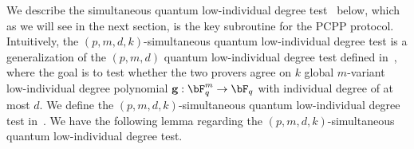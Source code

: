 We describe the simultaneous quantum low-individual degree test~\cite[Figure 3]{jiMIPRE2022a} below, which as we will see in the next section, is the key subroutine for the PCPP protocol. Intuitively, the $(p,m,d,k)$-simultaneous quantum low-individual degree test is a generalization of the $(p,m,d)$ quantum low-individual degree test defined in~, where the goal is to test whether the two provers agree on $k$ global $m$-variant low-individual degree polynomial $\textbf{g}: \bF_q^m \rightarrow \bF_q$ with individual degree of at most $d$. We define the $(p,m,d,k)$-simultaneous quantum low-individual degree test in~. We have the following lemma regarding the $(p,m,d,k)$-simultaneous quantum low-individual degree test.

